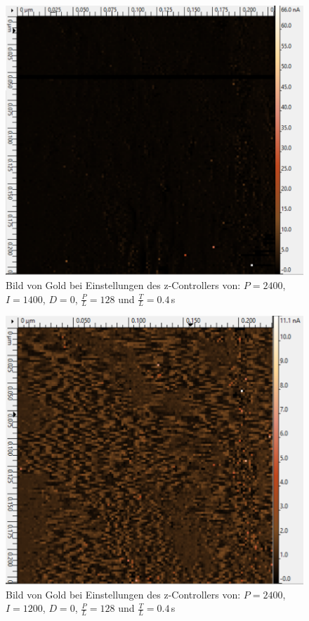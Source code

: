 \begin{figure}[ht]
	\includegraphics[scale=0.5]{Bild/Para/P9}
	\centering
	\caption[Parameter Änderung 9]{Bild von Gold bei Einstellungen des z-Controllers von: $P=2400$, $I=1400$, $D=0$, $\frac{P}{L}=128$ und $\frac{T}{L}=0.4\,$s}
\end{figure}
\begin{figure}[ht]
	\includegraphics[scale=0.5]{Bild/Para/P10}
	\centering
	\caption[Parameter Änderung 10]{Bild von Gold bei Einstellungen des z-Controllers von: $P=2400$, $I=1200$, $D=0$, $\frac{P}{L}=128$ und $\frac{T}{L}=0.4\,$s}
\end{figure}

